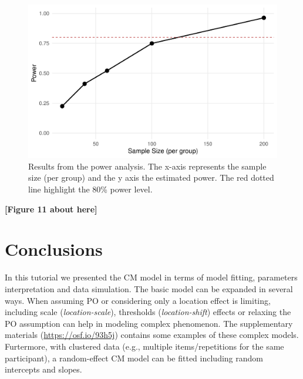 \documentclass[
  man,floatsintext]{apa6}
\begin{document}
\normalsize

\scriptsize

\begin{figure}

{\centering \includegraphics[width=1\linewidth]{paper_files/figure-latex/fig-power-curve-1} 

}

\caption{Results from the power analysis. The x-axis represents the sample size (per group) and the y axis the estimated power. The red dotted line highlight the 80\% power level.}\label{fig:fig-power-curve}
\end{figure}

\begin{center}\textbf{[Figure 11 about here]} \end{center}

\normalsize

\section{Conclusions}\label{conclusions}

In this tutorial we presented the CM model in terms of model fitting, parameters interpretation and data simulation. The basic model can be expanded in several ways. When assuming PO or considering only a location effect is limiting, including scale (\emph{location-scale}), thresholds (\emph{location-shift}) effects or relaxing the PO assumption can help in modeling complex phenomenon. The supplementary materials (\href{https://osf.io/93h5j/?view_only=33f262ee28374a88b935f0a25cefdb34}{https://osf.io/93h5j}) contains some examples of these complex models. Furtermore, with clustered data (e.g., multiple items/repetitions for the same participant), a random-effect CM model can be fitted including random intercepts and slopes.
\end{document}
